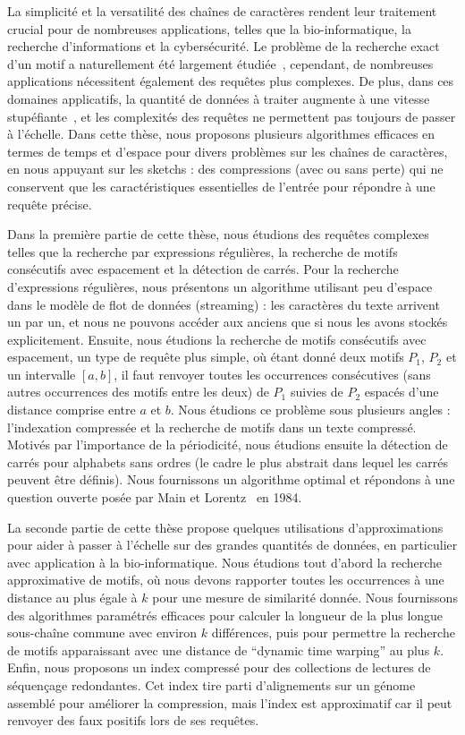La simplicité et la versatilité des chaînes de caractères rendent leur traitement crucial pour de nombreuses applications, telles que la bio-informatique, la recherche d'informations et la cybersécurité.
Le problème de la recherche exact d'un motif a naturellement été largement étudiée~\cite{Charras2004}, cependant, de nombreuses applications nécessitent également des requêtes plus complexes. De plus, dans ces domaines applicatifs, la quantité de données à traiter augmente à une vitesse stupéfiante~\cite{muir2016real}, et les complexités des requêtes ne permettent pas toujours de passer à l'échelle.
Dans cette thèse, nous proposons plusieurs algorithmes efficaces en termes de temps et d'espace pour divers problèmes sur les chaînes de caractères, en nous appuyant sur les sketchs : des compressions (avec ou sans perte) qui ne conservent que les caractéristiques essentielles de l'entrée pour répondre à une requête précise.

Dans la première partie de cette thèse, nous étudions des requêtes complexes telles que la recherche par expressions régulières, la recherche de motifs consécutifs avec espacement et la détection de carrés.
Pour la recherche d'expressions régulières, nous présentons un algorithme utilisant peu d'espace dans le modèle de flot de données (streaming) : les caractères du texte arrivent un par un, et nous ne pouvons accéder aux anciens que si nous les avons stockés explicitement.
Ensuite, nous étudions la recherche de motifs consécutifs avec espacement, un type de requête plus simple, où étant donné deux motifs $P_1$, $P_2$ et un intervalle $[a, b]$, il faut renvoyer toutes les occurrences consécutives (sans autres occurrences des motifs entre les deux) de $P_1$ suivies  de $P_2$ espacés d'une distance comprise entre $a$ et $b$. Nous étudions ce problème sous plusieurs angles : l'indexation compressée et la recherche de motifs dans un texte compressé.
Motivés par l'importance de la périodicité, nous étudions ensuite la détection de carrés pour alphabets sans ordres (le cadre le plus abstrait dans lequel les carrés peuvent être définis). Nous fournissons un algorithme optimal et répondons à une question ouverte posée par Main et Lorentz~\cite{Main1984} en 1984.

La seconde partie de cette thèse propose quelques utilisations d'approximations pour aider à passer à l'échelle sur des grandes quantités de données, en particulier avec application à la bio-informatique.
%
Nous étudions tout d'abord la recherche approximative de motifs, où nous devons rapporter toutes les occurrences à une distance au plus égale à $k$ pour une mesure de similarité donnée.
Nous fournissons des algorithmes paramétrés efficaces pour calculer la longueur de la plus longue sous-chaîne commune avec environ $k$ différences, puis pour permettre la recherche de motifs apparaissant avec une distance de ``dynamic time warping'' au plus $k$.
Enfin, nous proposons un index compressé pour des collections de lectures de séquençage redondantes. Cet index tire parti d'alignements sur un génome assemblé pour améliorer la compression, mais l'index est approximatif car il peut renvoyer des faux positifs lors de ses requêtes.